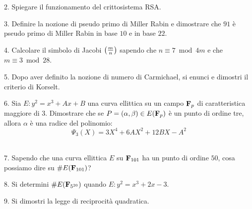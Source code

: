 \item{2.} Spiegare il funzionamento del crittosistema RSA. 
\vfill\eject\ \vskip-2cm

\item{3.} Definire la nozione di pseudo primo di Miller Rabin e dimostrare che $91$ \`e pseudo primo di Miller Rabin in base $10$ e in base $22$.\vfill

\item{4.} Calcolare il simbolo di Jacobi $\left({m\over n}\right)$ sapendo che $n\equiv 7\bmod 4m$ e che $m\equiv 3\bmod 28$.\vfill\eject\ \vskip-2cm


\item{5.} Dopo aver definito la nozione di numero di Carmichael, si enunci e dimostri il criterio di Korselt.
\vfill

\item{6.} Sia $E: y^2=x^3+Ax+B$ una curva ellittica su un campo ${\bf F}_p$ di caratteristica maggiore di $3$. 
Dimostrare che se $P=(\alpha,\beta)\in E({\bf F}_p)$ \`e un punto di ordine tre, allora $\alpha$ \`e una radice del polinomio:
$$\Psi_3(X)=3X^4+6AX^2+12BX-A^2$$
\vfill\eject\ \vskip-2cm

\item{7.} Sapendo che una curva ellittica $E$ su ${\bf F}_{101}$ ha un punto di ordine $50$, cosa possiamo dire su $\#E({\bf F}_{101})$?
\vfill

\item{8.} Si determini $\#E({\bf F}_{5^{20}})$ quando $E: y^2=x^3+2x-3$.\vfill

\item{9.} Si dimostri la legge di reciprocit\`a quadratica.

\vfill \eject\bye
